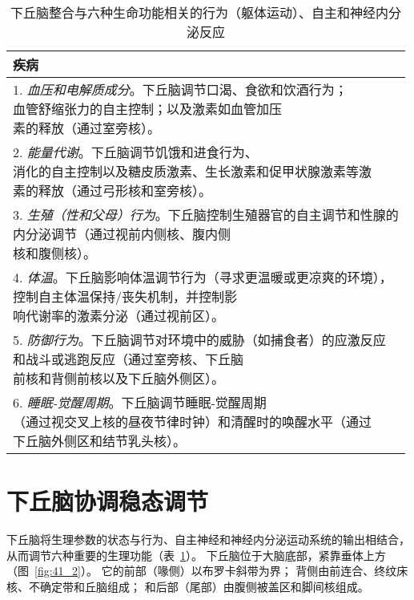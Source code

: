 \begin{table}[htbp]
	\caption{下丘脑整合与六种生命功能相关的行为（躯体运动）、自主和神经内分泌反应} \label{tab:41_1} \centering
	\begin{tabular}{l}
		\toprule
		疾病 \\
		\midrule
		\makecell[l]{1. \textit{血压和电解质成分}。下丘脑调节口渴、食欲和饮酒行为；\\血管舒缩张力的自主控制；以及激素如血管加压\\素的释放（通过室旁核）。}  \\
		\makecell[l]{2. \textit{能量代谢}。下丘脑调节饥饿和进食行为、\\消化的自主控制以及糖皮质激素、生长激素和促甲状腺激素等激\\素的释放（通过弓形核和室旁核）。}  \\
		\makecell[l]{3. \textit{生殖（性和父母）行为}。下丘脑控制生殖器官的自主调节和性腺的\\内分泌调节（通过视前内侧核、腹内侧\\核和腹侧核）。}  \\
		\makecell[l]{4. \textit{体温}。下丘脑影响体温调节行为（寻求更温暖或更凉爽的环境），\\控制自主体温保持/丧失机制，并控制影\\响代谢率的激素分泌（通过视前区）。}  \\
		\makecell[l]{5. \textit{防御行为}。下丘脑调节对环境中的威胁（如捕食者）的应激反应\\和战斗或逃跑反应（通过室旁核、下丘脑\\前核和背侧前核以及下丘脑外侧区）。}  \\
		\makecell[l]{6. \textit{睡眠-觉醒周期}。下丘脑调节睡眠-觉醒周期\\（通过视交叉上核的昼夜节律时钟）和清醒时的唤醒水平（通过\\下丘脑外侧区和结节乳头核）。}  \\
		\bottomrule
	\end{tabular}
\end{table}

\section{下丘脑协调稳态调节}

下丘脑将生理参数的状态与行为、自主神经和神经内分泌运动系统的输出相结合，从而调节六种重要的生理功能（表~\ref{tab:41_1}）。
下丘脑位于大脑底部，紧靠垂体上方（图~\ref{fig:41_2}）。
它的前部（喙侧）以布罗卡斜带为界；
背侧由前连合、终纹床核、不确定带和丘脑组成；
和后部（尾部）由腹侧被盖区和脚间核组成。


